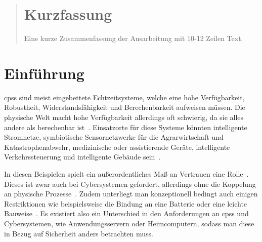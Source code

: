 \documentclass[final,bibliography=totocnumbered]{include/sikseminar}
\newcommand{\cps}{\glspl{cps}\xspace}
\begin{document}
\makeTitle

\makeAuthor
\date{Datum des Vortrags \todo}
\subject{Seminar Cyber-Physical Systems}

\maketitle

\begin{abstract}
\section*{Kurzfassung}
Eine kurze Zusammenfassung der Ausarbeitung mit 10-12 Zeilen Text.
\end{abstract}
\thispagestyle{empty}
\newpage
\tableofcontents
\newpage

\section{Einführung}\label{sec:intro}
\cps sind meist eingebettete Echtzeitsysteme, welche eine hohe Verfügbarkeit, Robustheit, Widerstandsfähigkeit und Berechenbarkeit aufweisen müssen.
Die physische Welt macht hohe Verfügbarkeit allerdings oft schwierig, da sie alles andere als berechenbar ist~\cite{Lee08,SGL+08}.
Einsatzorte für diese Systeme könnten intelligente Stromnetze, symbiotische Sensornetzwerke für die Agrarwirtschaft und Katastrophenabwehr, medizinische oder assistierende Geräte, intelligente Verkehrssteuerung und intelligente Gebäude sein~\cite{RLS+10}.

In diesen Beispielen spielt ein außerordentliches Maß an Vertrauen eine Rolle~\cite{SGL+08}.
Dieses ist zwar auch bei Cybersystemen gefordert, allerdings ohne die Koppelung an physische Prozesse~\cite{BG11}.
Zudem unterliegt man konzeptionell bedingt auch einigen Restriktionen wie beispielsweise die Bindung an eine Batterie oder eine leichte Bauweise~\cite{YWY+17}.
Es existiert also ein Unterschied in den Anforderungen an \cps und Cybersystemen, wie Anwendungsservern oder Heimcomputern, sodass man diese in Bezug auf Sicherheit anders betrachten muss.
\end{document}
